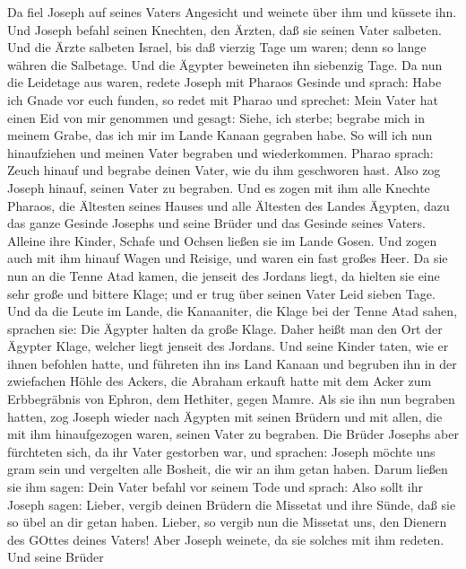  Da fiel Joseph auf seines Vaters Angesicht und weinete über
ihm und küssete ihn.  Und Joseph befahl seinen Knechten, den
Ärzten, daß sie seinen Vater salbeten. Und die Ärzte salbeten Israel,
 bis daß vierzig Tage um waren; denn so lange währen die
Salbetage. Und die Ägypter beweineten ihn siebenzig Tage. 
Da nun die Leidetage aus waren, redete Joseph mit Pharaos Gesinde und
sprach: Habe ich Gnade vor euch funden, so redet mit Pharao und
sprechet:  Mein Vater hat einen Eid von mir genommen und
gesagt: Siehe, ich sterbe; begrabe mich in meinem Grabe, das ich mir im
Lande Kanaan gegraben habe. So will ich nun hinaufziehen und meinen
Vater begraben und wiederkommen.  Pharao sprach: Zeuch
hinauf und begrabe deinen Vater, wie du ihm geschworen hast.
 Also zog Joseph hinauf, seinen Vater zu begraben. Und es
zogen mit ihm alle Knechte Pharaos, die Ältesten seines Hauses und alle
Ältesten des Landes Ägypten,  dazu das ganze Gesinde Josephs
und seine Brüder und das Gesinde seines Vaters. Alleine ihre Kinder,
Schafe und Ochsen ließen sie im Lande Gosen.  Und zogen auch
mit ihm hinauf Wagen und Reisige, und waren ein fast großes Heer.
 Da sie nun an die Tenne Atad kamen, die jenseit des
Jordans liegt, da hielten sie eine sehr große und bittere Klage; und er
trug über seinen Vater Leid sieben Tage.  Und da die Leute
im Lande, die Kanaaniter, die Klage bei der Tenne Atad sahen, sprachen
sie: Die Ägypter halten da große Klage. Daher heißt man den Ort der
Ägypter Klage, welcher liegt jenseit des Jordans.  Und
seine Kinder taten, wie er ihnen befohlen hatte,  und
führeten ihn ins Land Kanaan und begruben ihn in der zwiefachen Höhle
des Ackers, die Abraham erkauft hatte mit dem Acker zum Erbbegräbnis von
Ephron, dem Hethiter, gegen Mamre.  Als sie ihn nun
begraben hatten, zog Joseph wieder nach Ägypten mit seinen Brüdern und
mit allen, die mit ihm hinaufgezogen waren, seinen Vater zu begraben.
 Die Brüder Josephs aber fürchteten sich, da ihr Vater
gestorben war, und sprachen: Joseph möchte uns gram sein und vergelten
alle Bosheit, die wir an ihm getan haben.  Darum ließen sie
ihm sagen: Dein Vater befahl vor seinem Tode und sprach: 
Also sollt ihr Joseph sagen: Lieber, vergib deinen Brüdern die Missetat
und ihre Sünde, daß sie so übel an dir getan haben. Lieber, so vergib
nun die Missetat uns, den Dienern des GOttes deines Vaters! Aber Joseph
weinete, da sie solches mit ihm redeten.  Und seine Brüder
